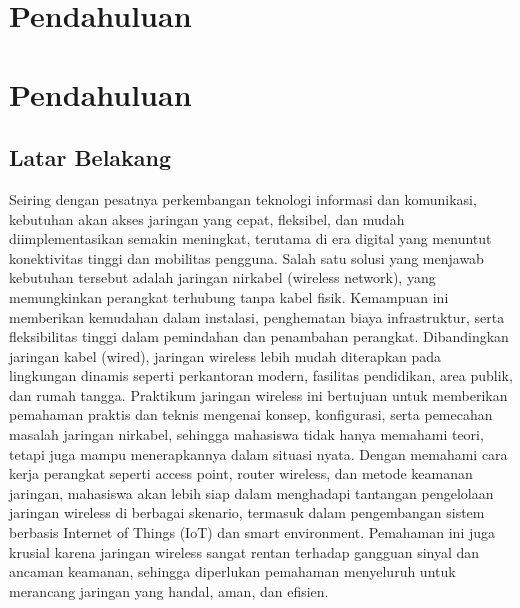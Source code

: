
\section{Pendahuluan}

\section{Pendahuluan}

\subsection{Latar Belakang}
Seiring dengan pesatnya perkembangan teknologi informasi dan komunikasi, kebutuhan akan akses jaringan yang cepat, fleksibel, dan mudah diimplementasikan semakin meningkat, terutama di era digital yang menuntut konektivitas tinggi dan mobilitas pengguna. Salah satu solusi yang menjawab kebutuhan tersebut adalah jaringan nirkabel (wireless network), yang memungkinkan perangkat terhubung tanpa kabel fisik. Kemampuan ini memberikan kemudahan dalam instalasi, penghematan biaya infrastruktur, serta fleksibilitas tinggi dalam pemindahan dan penambahan perangkat. Dibandingkan jaringan kabel (wired), jaringan wireless lebih mudah diterapkan pada lingkungan dinamis seperti perkantoran modern, fasilitas pendidikan, area publik, dan rumah tangga. Praktikum jaringan wireless ini bertujuan untuk memberikan pemahaman praktis dan teknis mengenai konsep, konfigurasi, serta pemecahan masalah jaringan nirkabel, sehingga mahasiswa tidak hanya memahami teori, tetapi juga mampu menerapkannya dalam situasi nyata. Dengan memahami cara kerja perangkat seperti access point, router wireless, dan metode keamanan jaringan, mahasiswa akan lebih siap dalam menghadapi tantangan pengelolaan jaringan wireless di berbagai skenario, termasuk dalam pengembangan sistem berbasis Internet of Things (IoT) dan smart environment. Pemahaman ini juga krusial karena jaringan wireless sangat rentan terhadap gangguan sinyal dan ancaman keamanan, sehingga diperlukan pemahaman menyeluruh untuk merancang jaringan yang handal, aman, dan efisien.

